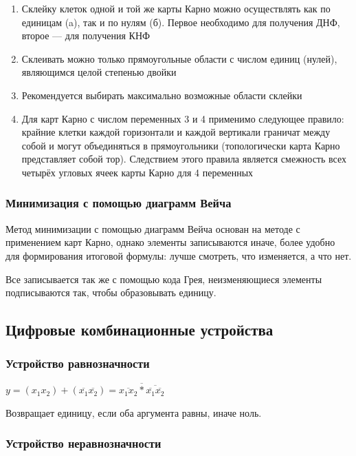 \documentclass{article}
\begin{document}
\begin{enumerate}
    \item Склейку клеток одной и той же карты Карно можно осуществлять как по единицам (a), так и по нулям (б). Первое необходимо для получения ДНФ, второе — для получения КНФ
    \item Склеивать можно только прямоугольные области с числом единиц (нулей), являющимся целой степенью двойки
    \item Рекомендуется выбирать максимально возможные области склейки
    \item Для карт Карно с числом переменных 3 и 4 применимо следующее правило: крайние клетки каждой горизонтали и каждой вертикали граничат между собой и могут объединяться в прямоугольники (топологически карта Карно представляет собой тор). Следствием этого правила является смежность всех четырёх угловых ячеек карты Карно для 4 переменных
\end{enumerate}

\subsubsection{Минимизация с помощью диаграмм Вейча}

Метод минимизации с помощью диаграмм Вейча основан на методе с применением карт Карно, однако элементы записываются иначе, более удобно для формирования итоговой формулы: лучше смотреть, что изменяется, а что нет.

Все записывается так же с помощью кода Грея, неизменяющиеся элементы подписываются так, чтобы образовывать единицу.

\subsection{Цифровые комбинационные устройства}

\subsubsection{Устройство равнозначности}

$y = (x_{1}x_{2}) + (\overline{x_{1}}\overline{x_{2}}) = \overline{\overline{x_{1}x_{2}} * \overline{\overline{x_1}\overline{x_2}}}$

Возвращает единицу, если оба аргумента равны, иначе ноль.

\subsubsection{Устройство неравнозначности}
\end{document}
